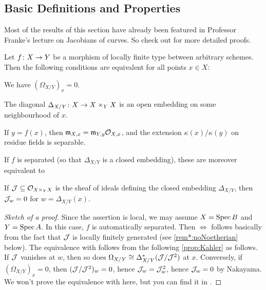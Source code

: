 \subsection{Basic Definitions and Properties}
Most of the results of this section have already been featured in Professor Franke's lecture on Jacobians of curves. So check out \cite[Section~2.7]{jacobians} for more detailed proofs.
\begin{prop}\label{prop:unramified}
	Let $f\colon X\morphism Y$ be a morphism of locally finite type between arbitrary schemes. Then the following conditions are equivalent for all points $x\in X$:
	\begin{alphanumerate}
		\item We have $(\Omega_{X/Y})_x=0$.
		\item The diagonal $\Delta_{X/Y}\colon X\morphism X\times_YX$ is an open embedding on some neighbourhood of $x$.
		\item If $y=f(x)$, then $\mathfrak{m}_{X,x}=\mathfrak{m}_{Y,y}\mathcal{O}_{X,x}$, and the extension $\kappa(x)/\kappa(y)$ on residue fields is separable.
	\end{alphanumerate}
	If $f$ is separated (so that $\Delta_{X/Y}$ is a closed embedding), these are moreover equivalent to
	\begin{alphanumerate}\setcounter{enumi}{3}
		\item If $\mathcal{J}\subseteq \mathcal{O}_{X\times_YX}$ is the sheaf of ideals defining the closed embedding $\Delta_{X/Y}$, then $\mathcal{J}_w=0$ for $w=\Delta_{X/Y}(x)$.
	\end{alphanumerate}
\end{prop}
\begin{proof}[Sketch of a proof]
	Since the assertion is local, we may assume $X=\operatorname{Spec} B$ and $Y=\operatorname{Spec} A$. In this case, $f$ is automatically separated. Then  $\Leftrightarrow$  follows basically from the fact that $\mathcal{J}$ is locally finitely generated (see \cref{rem*:noNoetherian} below). The equivalence with  follows from the following \cref{prop:Kahler} as follows. If $\mathcal{J}$ vanishes at $w$, then so does $\Omega_{X/Y}\cong \Delta_{X/Y}^*(\mathcal{J}/\mathcal{J}^2)$ at $x$. Conversely, if $(\Omega_{X/Y})_x=0$, then $(\mathcal{J}/\mathcal{J}^2)_w=0$, hence $\mathcal{J}_w=\mathcal{J}_w^2$, hence $\mathcal{J}_w=0$ by Nakayama. We won't prove the equivalence with  here, but you can find it in \cite[Lemma~2.7.2]{jacobians}.
\end{proof}
